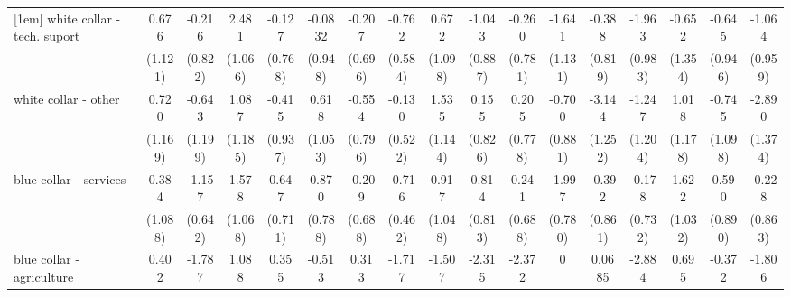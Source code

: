 {\begin{tabular}{l*{16}{c}}
[1em]
white collar - tech. suport&       0.676         &      -0.216         &       2.481\sym{*}  &      -0.127         &     -0.0832         &      -0.207         &      -0.762         &       0.672         &      -1.043         &      -0.260         &      -1.641         &      -0.388         &      -1.963\sym{*}  &      -0.652         &      -0.645         &      -1.064         \\
                    &     (1.121)         &     (0.822)         &     (1.066)         &     (0.768)         &     (0.948)         &     (0.696)         &     (0.584)         &     (1.098)         &     (0.887)         &     (0.781)         &     (1.131)         &     (0.819)         &     (0.983)         &     (1.354)         &     (0.946)         &     (0.959)         \\
[1em]
white collar - other&       0.720         &      -0.643         &       1.087         &      -0.415         &       0.618         &      -0.554         &      -0.130         &       1.535         &       0.155         &       0.205         &      -0.700         &      -3.144\sym{*}  &      -1.247         &       1.018         &      -0.745         &      -2.890\sym{*}  \\
                    &     (1.169)         &     (1.199)         &     (1.185)         &     (0.937)         &     (1.053)         &     (0.796)         &     (0.522)         &     (1.144)         &     (0.826)         &     (0.778)         &     (0.881)         &     (1.252)         &     (1.204)         &     (1.178)         &     (1.098)         &     (1.374)         \\
[1em]
blue collar - services&       0.384         &      -1.157         &       1.578         &       0.647         &       0.870         &      -0.209         &      -0.716         &       0.917         &       0.814         &       0.241         &      -1.997\sym{*}  &      -0.392         &      -0.178         &       1.622         &       0.590         &      -0.228         \\
                    &     (1.088)         &     (0.642)         &     (1.068)         &     (0.711)         &     (0.788)         &     (0.688)         &     (0.462)         &     (1.048)         &     (0.813)         &     (0.688)         &     (0.780)         &     (0.861)         &     (0.732)         &     (1.032)         &     (0.890)         &     (0.863)         \\
[1em]
blue collar - agriculture&       0.402         &      -1.787         &       1.088         &       0.355         &      -0.513         &       0.313         &      -1.717\sym{*}  &      -1.507         &      -2.315         &      -2.372\sym{*}  &           0         &      0.0685         &      -2.884\sym{*}  &       0.695         &      -0.372         &      -1.806         \\

\end{tabular}}
